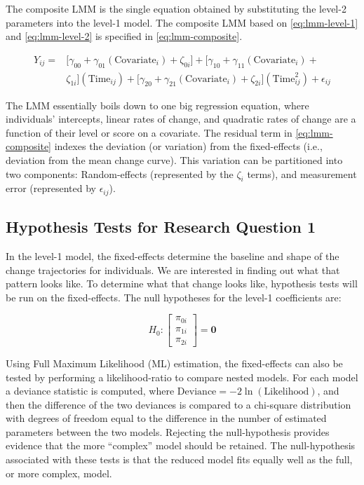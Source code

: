 \documentclass[11pt]{umnthesis}
\begin{document}
The composite LMM is the single equation obtained by substituting the level-2 parameters into the level-1 model. The composite LMM based on \autoref{eq:lmm-level-1} and \autoref{eq:lmm-level-2} is specified in \autoref{eq:lmm-composite}.

\begin{equation}\label{eq:lmm-composite}
\begin{split}
Y_{ij} = &\bigg[\gamma_{00} + \gamma_{01}(\mathrm{Covariate}_i) + \zeta_{0i}\bigg] + \bigg[\gamma_{10} + \gamma_{11}(\mathrm{Covariate}_i) +\\
&\zeta_{1i}\bigg](\mathrm{Time}_{ij}) + \bigg[\gamma_{20} + \gamma_{21}(\mathrm{Covariate}_i) + \zeta_{2i}\bigg](\mathrm{Time}_{ij}^2) + \epsilon_{ij}
\end{split}
\end{equation}

The LMM essentially boils down to one big regression equation, where individuals' intercepts, linear rates of change, and quadratic rates of change are a function of their level or score on a covariate. The residual term in \autoref{eq:lmm-composite} indexes the deviation (or variation) from the fixed-effects (i.e., deviation from the mean change curve). This variation can be partitioned into two components: Random-effects (represented by the \(\zeta_i\) terms), and measurement error (represented by \(\epsilon_{ij}\)).

\hypertarget{hypothesis-tests-for-research-question-1}{%
\subsection{Hypothesis Tests for Research Question 1}\label{hypothesis-tests-for-research-question-1}}

In the level-1 model, the fixed-effects determine the baseline and shape of the change trajectories for individuals. We are interested in finding out what that pattern looks like. To determine what that change looks like, hypothesis tests will be run on the fixed-effects. The null hypotheses for the level-1 coefficients are:

\[
H_0: \begin{bmatrix}\pi_{0i} \\ \pi_{1i} \\ \pi_{2i}\end{bmatrix} = \mathbf{0}
\]

Using Full Maximum Likelihood (ML) estimation, the fixed-effects can also be tested by performing a likelihood-ratio to compare nested models. For each model a deviance statistic is computed, where \(\mathrm{Deviance}=-2\ln(\mathrm{Likelihood})\), and then the difference of the two deviances is compared to a chi-square distribution with degrees of freedom equal to the difference in the number of estimated parameters between the two models. Rejecting the null-hypothesis provides evidence that the more ``complex'' model should be retained. The null-hypothesis associated with these tests is that the reduced model fits equally well as the full, or more complex, model.
\end{document}
